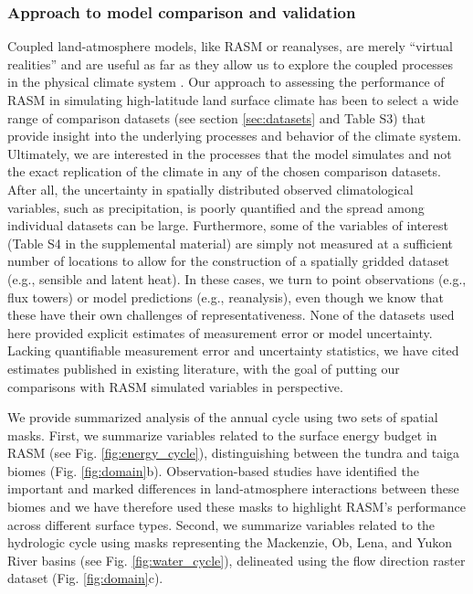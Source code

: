 \subsubsection{Approach to model comparison and validation}

Coupled land-atmosphere models, like RASM or reanalyses, are merely ``virtual realities'' and are useful as far as they allow us to explore the coupled processes in the physical climate system \citep{Betts_2004}.
Our approach to assessing the performance of RASM in simulating high-latitude land surface climate has been to select a wide range of comparison datasets (see section \ref{sec:datasets} and Table S3) that provide insight into the underlying processes and behavior of the climate system.
Ultimately, we are interested in the processes that the model simulates and not the exact replication of the climate in any of the chosen comparison datasets.
After all, the uncertainty in spatially distributed observed climatological variables, such as precipitation, is poorly quantified and the spread among individual datasets can be large.
Furthermore, some of the variables of interest (Table S4 in the supplemental material) are simply not measured at a sufficient number of locations to allow for the construction of a spatially gridded dataset (e.g., sensible and latent heat).
In these cases, we turn to point observations (e.g., flux towers) or model predictions (e.g., reanalysis), even though we know that these have their own challenges of representativeness.
None of the datasets used here provided explicit estimates of measurement error or model uncertainty.
Lacking quantifiable measurement error and uncertainty statistics, we have cited estimates published in existing literature, with the goal of putting our comparisons with RASM simulated variables in perspective.

We provide summarized analysis of the annual cycle using two sets of spatial masks.
First, we summarize variables related to the surface energy budget in RASM (see Fig. \ref{fig:energy_cycle}), distinguishing between the tundra and taiga biomes \citep{Olson_2001} (Fig. \ref{fig:domain}b).
Observation-based studies have identified the important and marked differences in land-atmosphere interactions between these biomes \citep{Beringer_2005,Chapin_2000a,Chapin_2000b} and we have therefore used these masks to highlight RASM's performance across different surface types.
Second, we summarize variables related to the hydrologic cycle using masks representing the Mackenzie, Ob, Lena, and Yukon River basins (see Fig. \ref{fig:water_cycle}), delineated using the \citet{Wu_2011} flow direction raster dataset (Fig. \ref{fig:domain}c).

